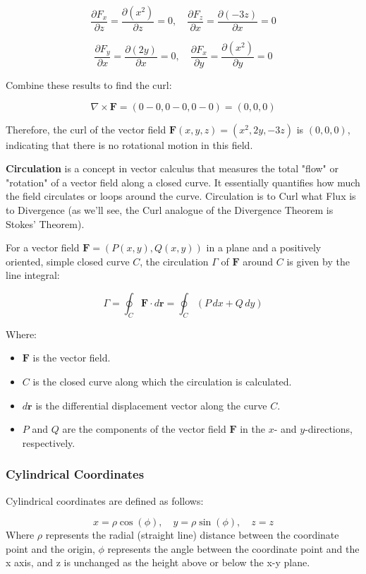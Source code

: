 \documentclass[12pt]{article}
\begin{document}
\[
\frac{\partial F_x}{\partial z} = \frac{\partial (x^2)}{\partial z} = 0, \quad \frac{\partial F_z}{\partial x} = \frac{\partial (-3z)}{\partial x} = 0
\]

\[
\frac{\partial F_y}{\partial x} = \frac{\partial (2y)}{\partial x} = 0, \quad \frac{\partial F_x}{\partial y} = \frac{\partial (x^2)}{\partial y} = 0
\]

Combine these results to find the curl:

\[
\nabla \times \mathbf{F} = \left( 0 - 0, 0 - 0, 0 - 0 \right) = (0, 0, 0)
\]

Therefore, the curl of the vector field \(\mathbf{F}(x, y, z) = (x^2, 2y, -3z)\) is \((0, 0, 0)\), indicating that there is no rotational motion in this field.



\textbf{Circulation} is a concept in vector calculus that measures the total "flow" or "rotation" of a vector field along a closed curve. It essentially quantifies how much the field circulates or loops around the curve. Circulation is to Curl what Flux is to Divergence (as we'll see, the Curl analogue of the Divergence Theorem is Stokes' Theorem).


For a vector field \( \mathbf{F} = (P(x, y), Q(x, y)) \) in a plane and a positively oriented, simple closed curve \( C \), the circulation \( \Gamma \) of \( \mathbf{F} \) around \( C \) is given by the line integral:

\[
\Gamma = \oint_C \mathbf{F} \cdot d\mathbf{r} = \oint_C (P \, dx + Q \, dy)
\]

Where:
\begin{itemize}
    \item \( \mathbf{F} \) is the vector field.
    \item \( C \) is the closed curve along which the circulation is calculated.
    \item \( d\mathbf{r} \) is the differential displacement vector along the curve \( C \).
    \item \( P \) and \( Q \) are the components of the vector field \( \mathbf{F} \) in the \( x \)- and \( y \)-directions, respectively.
\end{itemize}

\subsubsection{Cylindrical Coordinates}
Cylindrical coordinates are defined as follows:

\[x = \rho\cos(\phi), \quad y = \rho\sin(\phi),\quad z = z\]
Where \(\rho\) represents the radial (straight line) distance between the coordinate point and the origin, \(\phi\) represents the angle between the coordinate point and the x axis, and z is unchanged as the height above or below the x-y plane. \\
\end{document}
